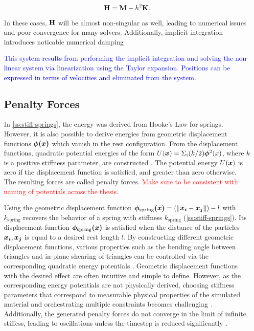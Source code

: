 \begin{equation}\label{eq:system-H}
    \mathbf{H} = \mathbf{M} - h^2\mathbf{K}.
\end{equation}

In these cases, $\mathbf{H}$ will be almost non-singular as well, leading to numerical issues and poor convergence for many solvers. 
Additionally, implicit integration introduces noticable numerical damping \cite{servin2006}.

\textcolor{blue}{This system results from performing the implicit integration and solving the non-linear system via linearization
using the Taylor expansion. Positions can be expressed in terms of velocities and eliminated from the system.}

\subsection{Penalty Forces}\label{ss:penalty-forces}
In \cref{ss:stiff-springs}, the energy was derived from Hooke's Law for springs. However, it is also possible to derive energies from 
geometric displacement functions $\bm{\phi(x)}$ which vanish in the rest configuration. From the displacement functions, quadratic 
potential energies of the form $U(\bm{x}) = \Sigma_i (k / 2) \bm{\phi}^2(x)$, where $k$ is a positive stiffness parameter, are 
constructed \cite{terz1987}. The potential energy $U(\bm{x})$ is zero if the displacement function is satisfied, and greater than 
zero otherwise. The resulting forces are called penalty forces. \textcolor{red}{Make sure to be consistent with naming of potentials
across the thesis.}

Using the geometric displacement function $\bm{\phi_{\text{spring}}(x)} = (\lVert \bm{x_i} - \bm{x_j} \rVert) - l$ with $k_{\text{spring}}$ 
recovers the behavior of a spring with stiffness $k_{\text{spring}}$ (\cref{ss:stiff-springs}). Its displacement function 
$\bm{\phi_{\text{spring}}(x)}$ is satisfied when the distance of the particles $\bm{x_i}, \bm{x_j}$ is equal to a desired rest length $l$. 
By constructing different geometric displacement functions, various properties such as the bending angle between triangles and in-plane 
shearing of triangles can be controlled via the corresponding quadratic energy potentials \cite{baraff1998}. Geometric displacement 
functions with the desired effect are often intuitive and simple to define. However, as the corresponding energy potentials are not physically 
derived, choosing stiffness parameters that correspond to measurable physical properties of the simulated material and orchestrating 
multiple constraints becomes challenging \cite{servin2006, nealen2006}. Additionally, the generated penalty forces do not converge in the 
limit of infinite stiffess, leading to oscillations unless the timestep is reduced significantly \cite{rubin1957}.

